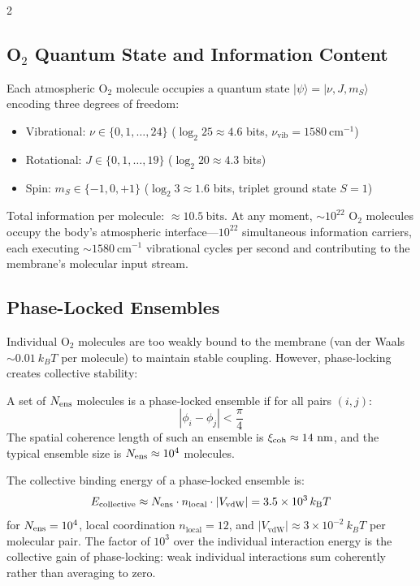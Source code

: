 \begin{multicols}{2}
\subsection{O$_2$ Quantum State and Information Content}

Each atmospheric O$_2$ molecule occupies a quantum state $|\psi\rangle = |\nu, J, m_S\rangle$ encoding three degrees of freedom:
\begin{itemize}
\item Vibrational: $\nu \in \{0, 1, \ldots, 24\}$ ($\log_2 25 \approx 4.6$ bits, $\nu_{\mathrm{vib}} = 1580\ \mathrm{cm}^{-1}$)
\item Rotational: $J \in \{0, 1, \ldots, 19\}$ ($\log_2 20 \approx 4.3$ bits)
\item Spin: $m_S \in \{-1, 0, +1\}$ ($\log_2 3 \approx 1.6$ bits, triplet ground state $S = 1$)
\end{itemize}
Total information per molecule: $\approx 10.5\ \mathrm{bits}$. At any moment, $\sim 10^{22}$ O$_2$ molecules occupy the body's atmospheric interface---$10^{22}$ simultaneous information carriers, each executing $\sim 1580\ \mathrm{cm}^{-1}$ vibrational cycles per second and contributing to the membrane's molecular input stream.

\subsection{Phase-Locked Ensembles}

Individual O$_2$ molecules are too weakly bound to the membrane (van der Waals $\sim 0.01\ k_BT$ per molecule) to maintain stable coupling. However, phase-locking creates collective stability:

\begin{definition}
\label{def:ensemble}
A set of $N_{\mathrm{ens}}$ molecules is a phase-locked ensemble if for all pairs $(i, j)$:
\begin{equation}
|\phi_i - \phi_j| < \frac{\pi}{4}
\label{eq:ch11_phasecond}
\end{equation}
The spatial coherence length of such an ensemble is $\xi_{\mathrm{coh}} \approx 14\ \mathrm{nm}$, and the typical ensemble size is $N_{\mathrm{ens}} \approx 10^4$ molecules.
\end{definition}

The collective binding energy of a phase-locked ensemble is:
\begin{equation}
E_{\mathrm{collective}} \approx N_{\mathrm{ens}} \cdot n_{\mathrm{local}} \cdot |V_{\mathrm{vdW}}| = 3.5 \times 10^3\,k_{\mathrm{B}} T
\label{eq:ch11_collective}
\end{equation}
for $N_{\mathrm{ens}} = 10^4$, local coordination $n_{\mathrm{local}} = 12$, and $|V_{\mathrm{vdW}}| \approx 3 \times 10^{-2}\ k_BT$ per molecular pair. The factor of $10^3$ over the individual interaction energy is the collective gain of phase-locking: weak individual interactions sum coherently rather than averaging to zero.


\end{multicols}
